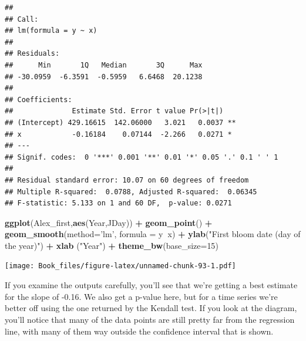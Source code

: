 \documentclass[
]{book}
\newenvironment{Shaded}{\begin{snugshade}}{\end{snugshade}}
\newcommand{\DataTypeTok}[1]{\textcolor[rgb]{0.13,0.29,0.53}{#1}}
\newcommand{\DecValTok}[1]{\textcolor[rgb]{0.00,0.00,0.81}{#1}}
\newcommand{\KeywordTok}[1]{\textcolor[rgb]{0.13,0.29,0.53}{\textbf{#1}}}
\newcommand{\NormalTok}[1]{#1}
\newcommand{\OperatorTok}[1]{\textcolor[rgb]{0.81,0.36,0.00}{\textbf{#1}}}
\newcommand{\StringTok}[1]{\textcolor[rgb]{0.31,0.60,0.02}{#1}}
\begin{document}
\begin{Shaded}
\end{Shaded}

\begin{verbatim}
## 
## Call:
## lm(formula = y ~ x)
## 
## Residuals:
##      Min       1Q   Median       3Q      Max 
## -30.0959  -6.3591  -0.5959   6.6468  20.1238 
## 
## Coefficients:
##              Estimate Std. Error t value Pr(>|t|)   
## (Intercept) 429.16615  142.06000   3.021   0.0037 **
## x            -0.16184    0.07144  -2.266   0.0271 * 
## ---
## Signif. codes:  0 '***' 0.001 '**' 0.01 '*' 0.05 '.' 0.1 ' ' 1
## 
## Residual standard error: 10.07 on 60 degrees of freedom
## Multiple R-squared:  0.0788, Adjusted R-squared:  0.06345 
## F-statistic: 5.133 on 1 and 60 DF,  p-value: 0.0271
\end{verbatim}

\begin{Shaded}
\begin{Highlighting}[]
\KeywordTok{ggplot}\NormalTok{(Alex_first,}\KeywordTok{aes}\NormalTok{(Year,JDay)) }\OperatorTok{+}
\StringTok{  }\KeywordTok{geom_point}\NormalTok{() }\OperatorTok{+}
\StringTok{  }\KeywordTok{geom_smooth}\NormalTok{(}\DataTypeTok{method=}\StringTok{'lm'}\NormalTok{, }\DataTypeTok{formula =}\NormalTok{ y}\OperatorTok{~}\NormalTok{x) }\OperatorTok{+}
\StringTok{  }\KeywordTok{ylab}\NormalTok{(}\StringTok{"First bloom date (day of the year)"}\NormalTok{) }\OperatorTok{+}
\StringTok{  }\KeywordTok{xlab}\NormalTok{ (}\StringTok{"Year"}\NormalTok{) }\OperatorTok{+}
\StringTok{  }\KeywordTok{theme_bw}\NormalTok{(}\DataTypeTok{base_size=}\DecValTok{15}\NormalTok{)}
\end{Highlighting}
\end{Shaded}

\texttt{[image: Book\_files/figure-latex/unnamed-chunk-93-1.pdf]}

If you examine the outputs carefully, you'll see that we're getting a best estimate for the slope of -0.16. We also get a p-value here, but for a time series we're better off using the one returned by the Kendall test. If you look at the diagram, you'll notice that many of the data points are still pretty far from the regression line, with many of them way outside the confidence interval that is shown.
\end{document}
